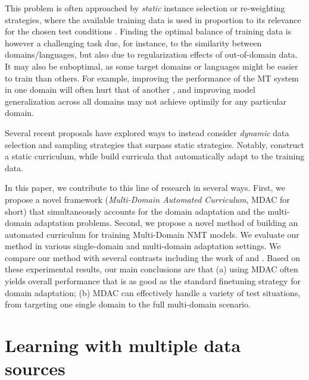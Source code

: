 \documentclass[11pt]{article}
\begin{document}
This problem is often approached by \emph{static} instance selection or re-weighting strategies, where the available training data is used in proportion to its relevance for the chosen test conditions \citep{Moore10selection,Axelrod11domain}. Finding the optimal balance of training data is however a challenging task due, for instance, to the similarity between domains/languages, but also due to regularization effects of out-of-domain data. It may also be suboptimal, as some target domains or languages might be easier to train than others. For example, improving the performance of the MT system in one domain will often hurt that of another \citep{Vanderwees17dynamic, Britz17mixing}, and improving model generalization across all domains \citep{koehn18findings} may not achieve optimily for any particular domain. 

Several recent proposals
have explored ways to instead consider \emph{dynamic} data selection and sampling strategies that surpass static strategies. Notably,  \citet{Vanderwees17dynamic,Zhang19curriculum} construct a static curriculum, while\citet{Graves17automated,platanios19competence,Kumar19reinforcement,Wang20balancing,Wang20learning-multi} build curricula that automatically adapt to the training data.

In this paper, we contribute to this line of research in several ways. First, we propose a novel framework (\emph{Multi-Domain Automated Curriculum}, MDAC for short) that simultaneously accounts for the domain adaptation and the multi-domain adaptation problems. Second, we propose a novel method of building an automated curriculum for training Multi-Domain NMT models. We evaluate our method in various single-domain and multi-domain adaptation settings. We compare our method with several contrasts including the work of \citet{Zhang19curriculum} and \citet{Wang20balancing}.
Based on these experimental results, our main conclusions are that (a) using MDAC often yields overall performance that is as good as the standard finetuning strategy for domain adaptation; (b) MDAC can effectively handle a variety of test situations, from targeting one single domain to the full multi-domain scenario. %

\section{Learning with multiple data sources} \label{sec:mdmt}
\end{document}
